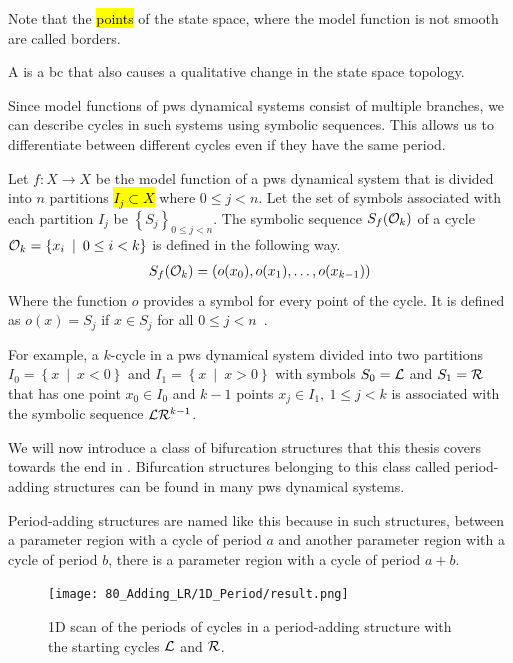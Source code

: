 Note that the \hl{points} of the state space, where the model function is not smooth are called borders.

\begin{definition}
	A  is a \gls{bc} that also causes a qualitative change in the state space topology.
\end{definition}

Since model functions of \gls{pws} dynamical systems consist of multiple branches, we can describe cycles in such systems using symbolic sequences.
This allows us to differentiate between different cycles even if they have the same period.

\begin{definition}
	Let $f: X \to X$ be the model function of a \gls{pws} dynamical system that is divided into $n$ partitions \hl{$I_j \subset X$} where $0 \leq j < n$.
	Let the set of symbols associated with each partition $I_j$ be $\left\{S_j\right\}_{0 \leq j < n}$.
	The symbolic sequence $S_f(\mathcal{O}_k)$ of a cycle $\mathcal{O}_k = \left\{x_i \:\mid\: 0 \leq i < k\right\}$ is defined in the following way.
	\begin{align}
		S_f(\mathcal{O}_k) = \left(o(x_0), o(x_1), \dots, o(x_{k-1})\right)
	\end{align}
	Where the function $o$ provides a symbol for every point of the cycle.
	It is defined as $o(x) = S_j$ if $x \in S_j$ for all $0 \leq j < n$~\cite{granados14adding}.
\end{definition}

For example, a $k$-cycle in a \gls{pws} dynamical system divided into two partitions $I_0 = \left\{x \:\mid\: x < 0\right\}$ and $I_1 = \left\{x \:\mid\: x > 0\right\}$ with symbols $S_0 = \mathcal{L}$ and $S_1 = \mathcal{R}$ that has one point $x_0 \in I_0$ and $k-1$ points $x_j \in I_1, \:1 \leq j < k$ is associated with the symbolic sequence $\mathcal{L}\mathcal{R}^{k-1}$.

We will now introduce a class of bifurcation structures that this thesis covers towards the end in .
Bifurcation structures belonging to this class called period-adding structures can be found in many \gls{pws} dynamical systems.

Period-adding structures are named like this because in such structures, between a parameter region with a cycle of period $a$ and another parameter region with a cycle of period $b$, there is a parameter region with a cycle of period $a + b$.

\begin{figure}
	\centering
	\texttt{[image: 80\_Adding\_LR/1D\_Period/result.png]}
	\caption[1D scan of periods in a period-adding structure between $\L$ and $\R$]{
		1D scan of the periods of cycles in a period-adding structure with the starting cycles $\L$ and $\R$.
	}
\end{figure}

